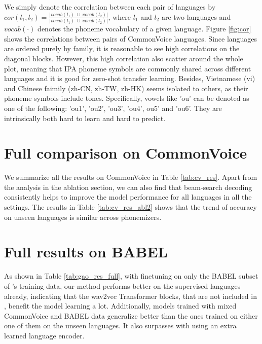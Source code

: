 \documentclass{article}
\begin{document}
\begin{appendices}
We simply denote the correlation between each pair of languages by $cor(l_1, l_2) = \frac{|vocab(l_1)~\cup~vocab(l_2)|}{|vocab(l_1)~\cup~vocab(l_2)|}$, where $l_1$ and $l_2$ are two languages and $vocab(\cdot)$ denotes the phoneme vocabulary of a given language. Figure \ref{fig:cor} shows the correlations between pairs of CommonVoice languages. Since languages are ordered purely by family, it is reasonable to see high correlations on the diagonal blocks. However, this high correlation also scatter around the whole plot, meaning that IPA phoneme symbols are commonly shared across different languages and it is good for zero-shot transfer learning. Besides, Vietnamese (vi) and Chinese faimily (zh-CN, zh-TW, zh-HK) seems isolated to others, as their phoneme symbols include tones. Specifically, vowels like 'ou' can be denoted as one of the following: 'ou1', 'ou2', 'ou3', 'ou4', ou5' and 'ou6'. They are intrinsically both hard to learn and hard to predict. 



\section{Full comparison on CommonVoice}

We summarize all the results on CommonVoice in Table \ref{tab:cv_res}. Apart from the analysis in the ablation section, we can also find that beam-search decoding consistently helps to improve the model performance for all languages in all the settings. The results in Table \ref{tab:cv_res_abl2} shows that the trend of accuracy on unseen languages is similar across phonemizers. 

\section{Full results on BABEL}


As shown in Table \ref{tab:gao_res_full}, with finetuning on only the BABEL subset of \cite{gaozero}'s training data, our method performs better on the supervised languages already, indicating that the wav2vec Transformer blocks, that are not included in \cite{gaozero}, benefit the model learning a lot. Additionally, models trained with mixed CommonVoice and BABEL data generalize better than the ones trained on either one of them on the unseen languages. It also surpasses \cite{gaozero} with using an extra learned language encoder.

\end{appendices}
\end{document}
